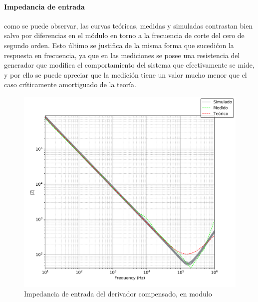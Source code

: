 \paragraph*{Impedancia de entrada} como se puede observar, las curvas te\'oricas, medidas y simuladas contrastan bien salvo
por diferencias en el m\'odulo en torno a la frecuencia de corte del cero de segundo orden. Esto \'ultimo se justifica de la misma forma que sucedi\' con la 
respuesta en frecuencia, ya que en las mediciones se posee una resistencia del generador que modifica el comportamiento del sistema que efectivamente se mide,
y por ello se puede apreciar que la medici\'on tiene un valor mucho menor que el caso cr\'iticamente amortiguado de la teor\'ia.

\begin{figure}[H]
	\centering
	\includegraphics[scale=0.7]{../EJ4/Recursos/Derivador_compensado/impedancia_modulo.png}
	\caption{Impedancia de entrada del derivador compensado, en modulo}
	\label{fig:derivador_compensado_impedancia_modulo}
\end{figure}

